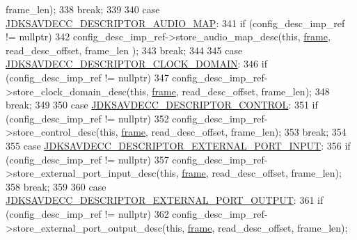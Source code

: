 \begin{DoxyCode}
      frame\_len);
338                 \textcolor{keywordflow}{break};
339 
340             \textcolor{keywordflow}{case} \hyperlink{group__descriptor_ga8b923dc5b431ec457fc26e0dcfa88104}{JDKSAVDECC\_DESCRIPTOR\_AUDIO\_MAP}:
341                 \textcolor{keywordflow}{if} (config\_desc\_imp\_ref != \textcolor{keyword}{nullptr})
342                     config\_desc\_imp\_ref->store\_audio\_map\_desc(\textcolor{keyword}{this}, \hyperlink{gst__avb__playbin_8c_ac8e710e0b5e994c0545d75d69868c6f0}{frame}, read\_desc\_offset, frame\_len
      );
343                 \textcolor{keywordflow}{break};
344 
345             \textcolor{keywordflow}{case} \hyperlink{group__descriptor_ga589df1006298ffeb54b5c7e5a831b062}{JDKSAVDECC\_DESCRIPTOR\_CLOCK\_DOMAIN}:
346                 \textcolor{keywordflow}{if} (config\_desc\_imp\_ref != \textcolor{keyword}{nullptr})
347                     config\_desc\_imp\_ref->store\_clock\_domain\_desc(\textcolor{keyword}{this}, \hyperlink{gst__avb__playbin_8c_ac8e710e0b5e994c0545d75d69868c6f0}{frame}, read\_desc\_offset, 
      frame\_len);
348                 \textcolor{keywordflow}{break};
349 
350             \textcolor{keywordflow}{case} \hyperlink{group__descriptor_gaafb6bdc564bbe2b62cb6f91bdb8185a8}{JDKSAVDECC\_DESCRIPTOR\_CONTROL}:
351                 \textcolor{keywordflow}{if} (config\_desc\_imp\_ref != \textcolor{keyword}{nullptr})
352                     config\_desc\_imp\_ref->store\_control\_desc(\textcolor{keyword}{this}, \hyperlink{gst__avb__playbin_8c_ac8e710e0b5e994c0545d75d69868c6f0}{frame}, read\_desc\_offset, frame\_len);
353                 \textcolor{keywordflow}{break};
354 
355             \textcolor{keywordflow}{case} \hyperlink{group__descriptor_ga20b1f1b3c8549b4607fa248c9df38c82}{JDKSAVDECC\_DESCRIPTOR\_EXTERNAL\_PORT\_INPUT}:
356                 \textcolor{keywordflow}{if} (config\_desc\_imp\_ref != \textcolor{keyword}{nullptr})
357                     config\_desc\_imp\_ref->store\_external\_port\_input\_desc(\textcolor{keyword}{this}, 
      \hyperlink{gst__avb__playbin_8c_ac8e710e0b5e994c0545d75d69868c6f0}{frame}, read\_desc\_offset, frame\_len);
358                 \textcolor{keywordflow}{break};
359 
360             \textcolor{keywordflow}{case} \hyperlink{group__descriptor_ga4a49e95850c4a63f051a9fe9aebde7e8}{JDKSAVDECC\_DESCRIPTOR\_EXTERNAL\_PORT\_OUTPUT}:
361                 \textcolor{keywordflow}{if} (config\_desc\_imp\_ref != \textcolor{keyword}{nullptr})
362                     config\_desc\_imp\_ref->store\_external\_port\_output\_desc(\textcolor{keyword}{this}, 
      \hyperlink{gst__avb__playbin_8c_ac8e710e0b5e994c0545d75d69868c6f0}{frame}, read\_desc\_offset, frame\_len);

\end{DoxyCode}
